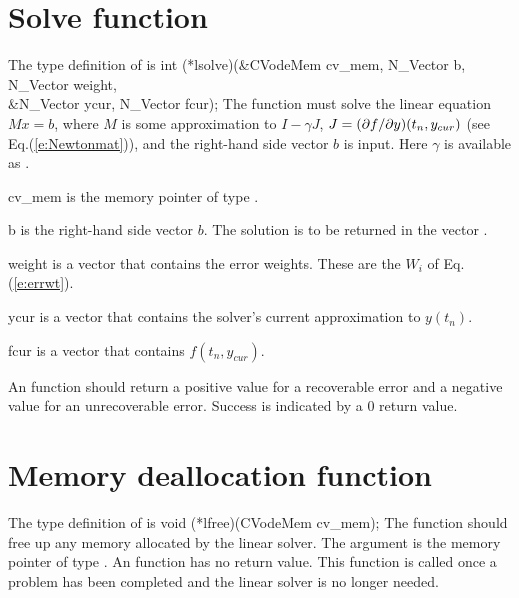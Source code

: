 \section{Solve function}
The type definition of  is
{
  int (*lsolve)(&CVodeMem cv\_mem, N\_Vector b, N\_Vector weight, \\
                &N\_Vector ycur, N\_Vector fcur);  
}
{
  The function  must solve the linear equation $M x = b$, where         
  $M$ is some approximation to $I - \gamma J$, $J = (\partial f / \partial y)(t_n, y_{cur})$
  (see Eq.(\ref{e:Newtonmat})), and the right-hand side vector $b$ is input. 
  Here $\gamma$ is available as .
}
{
  \begin{args}[cv\_mem]
  \item[cv\_mem]
    is the {\cvodes} memory pointer of type .
  \item[b]
    is the right-hand side vector $b$. The solution is to be    
    returned in the vector .
  \item[weight]
    is a vector that contains the error weights.
    These are the $W_i$ of Eq.(\ref{e:errwt}).
  \item[ycur]
    is a vector that contains the solver's current approximation to $y(t_n)$.
  \item[fcur]
    is a vector that contains $f(t_n,y_{cur})$. 
  \end{args}
}
{
  An  function should return a positive value    
  for a recoverable error and a negative value for an             
  unrecoverable error. Success is indicated by a $0$ return value.
}
{}


\section{Memory deallocation function}
The type definition of  is
{
  void (*lfree)(CVodeMem cv\_mem);
}
{
  The function  should free up any memory allocated by the linear
  solver.
}
{
  The argument  is the {\cvodes} memory pointer of type .
}
{
  An  function has no return value.
}
{
  This function is called once a problem has been completed and the 
  linear solver is no longer needed.
}